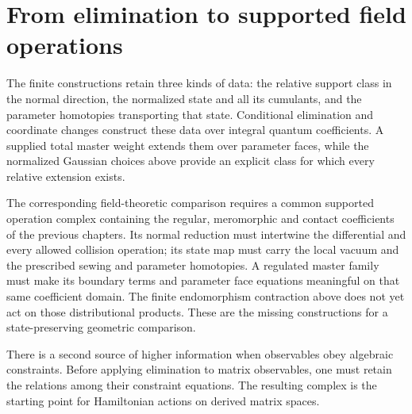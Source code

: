 \section{From elimination to supported field operations}
\label{sec:vol2-state-geometric-comparison}

The finite constructions retain three kinds of data:
the relative support class in the normal direction,
the normalized state and all its cumulants, and the
parameter homotopies transporting that state. Conditional
elimination and coordinate changes construct these data
over integral quantum coefficients. A supplied total
master weight extends them over parameter faces, while
the normalized Gaussian choices above provide an explicit
class for which every relative extension exists.

The corresponding field-theoretic comparison requires a
common supported operation complex containing the
regular, meromorphic and contact coefficients of the
previous chapters. Its normal reduction must intertwine
the differential and every allowed collision operation;
its state map must carry the local vacuum and the
prescribed sewing and parameter homotopies. A regulated
master family must make its boundary terms and parameter
face equations meaningful on that same coefficient
domain. The finite endomorphism contraction above does
not yet act on those distributional products. These are
the missing constructions for a state-preserving
geometric comparison.

There is a second source of higher information when
observables obey algebraic constraints. Before applying
elimination to matrix observables, one must retain the
relations among their constraint equations. The resulting
complex is the starting point for Hamiltonian actions on
derived matrix spaces.
